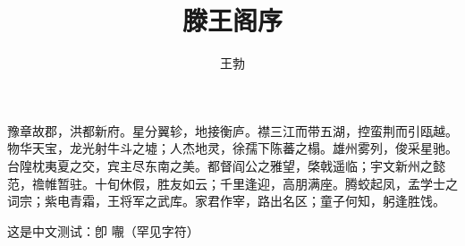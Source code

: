 \documentclass{ctexart}
\title{滕王阁序}
\author{王勃}
\begin{document}
\maketitle

豫章故郡，洪都新府。星分翼轸，地接衡庐。襟三江而带五湖，控蛮荆而引瓯越。物华天宝，龙光射牛斗之墟；人杰地灵，徐孺下陈蕃之榻。雄州雾列，俊采星驰。台隍枕夷夏之交，宾主尽东南之美。都督阎公之雅望，棨戟遥临；宇文新州之懿范，䄡帷暂驻。十旬休假，胜友如云；千里逢迎，高朋满座。腾蛟起凤，孟学士之词宗；紫电青霜，王将军之武库。家君作宰，路出名区；童子何知，躬逢胜饯。

这是中文测试：卽 𡃁（罕见字符）
\end{document}
